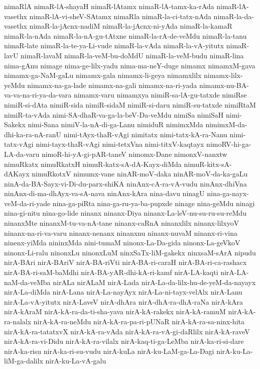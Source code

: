 {nimaRlA
nimaR-lA-shayaH
nimaR-lAtamx
nimaR-lA-tamx-ka-rAda
nimaR-lA-vasethx
nimaR-lA-vi-sheV-SAtamx
nimaRla
nimaR-la-ci-tatx-nAda
nimaR-la-da-vasethx
nimaR-la-jAcnx-nadiM
nimaR-la-jAcnx-ni-yAda
nimaR-la-kamaR
nimaR-la-nAda
nimaR-la-nA-gu-tAtxne
nimaR-la-rA-de-veMdu
nimaR-la-tanu
nimaR-late
nimaR-la-te-ya-Li-vude
nimaR-la-vAda
nimaR-la-vA-yitutx
nimaR-lavU
nimaR-lavaM
nimaR-la-veM-bu-doMdU
nimaR-la-veM-budu
nimaR-lina
nima-gAnu
nimage
nima-ge-lilx-yadu
nima-ma-neY-duge
nimamx
nimamxM-gava
nimamx-ga-NaM-gaLu
nimamx-gala
nimamx-li-geya
nimamxlilx
nimamx-lilx-yeMdu
nimamx-na-ga-lade
nimamx-na-gali
nimamx-na-ri-yada
nimamx-nu-BA-va-va-na-ri-ya-da-vara
nimamx-varu
nimamxya
nimiR-sa-lA-gu-tatxde
nimiRse
nimiR-si-dAta
nimiR-sida
nimiR-sidaM
nimiR-si-daru
nimiR-su-tatxde
nimiRtaM
nimiR-ta-vAda
nimi-SA-dhaR-va-ga-la-beV-Da-veMdu
nimiSa
nimiSaH
nimi-Sakekx
nimi-Sana
nimiV-la-nA-di-ga-Lanu
nimiduR
nimimxMda
nimimxM-da-dhi-ka-ra-nA-ranU
nimi-tAyx-thaR-vAgi
nimitatx
nimi-tatx-kA-ra-Nanu
nimi-tatx-vAgi
nimi-tayx-thaR-vAgi
nimi-tetxVna
nimi-titxV-kaqtayx
nimoRV-hi-ga-LA-da-varu
nimoR-hi-yA-gi-pAR-taneV
nimomx-Dane
nimonxV-nanxtw
nimuRkatx
nimuRkatxH
nimuR-katx-sA-dA-Kayx-diMda
nimuR-kitx-sA-dAKayx
nimuRkotxV
nimumx-vane
ninAR-moV-daka
ninAR-moV-da-ka-gaLu
ninA-da-BA-Sayx-vi-Di-du-parx-shiKA
ninAnx-cA-ra-vA-vudu
ninAnx-dhiVna
ninAnx-di-ma-dhAyx-va-sA-nava
ninAnx-kAra
nina-davu
ninagU
nina-ga-nayx-veM-da-ri-yade
nina-ga-piRta
nina-ga-ru-ya-ba-pupxde
ninage
nina-geMdu
ninagi
nina-gi-nitu
nina-go-lide
ninanx
ninanx-Diya
ninanx-La-leV-nu-su-ru-su-reMdu
ninanxMte
ninanxM-tu-va-nA-tane
ninanx-caRnA
ninanxlilx
ninanx-lilxyoV
ninanx-na-ri-va-varu
ninanx-nenanx
ninanxnu
ninanx-nuvaM
ninanx-ri-vina
ninenx-yiMda
nininxMda
nini-tumaM
ninonx-La-Da-gida
ninonx-La-geVkoV
ninonx-Li-ralu
ninonxLu
ninonxLuM
ninxSaTx-liM-gakekx
ninxsaM-sArA
nipudu
nirA-BAri
nirA-BAriV
nirA-BA-riVti
nirA-BA-ri-caraH
nirA-BA-ri-ca-rashacx
nirA-BA-ri-saM-baMdhi
nirA-BA-yAR-dhi-kA-ri-kamf
nirA-LA-kaqti
nirA-LA-naM-da-veMba
nirALa
nirALaM
nirA-Lada
nirA-La-da-lilx-hu-de-yeM-da-nayayx
nirA-La-diMda
nirA-Lana
nirA-La-nayAyx
nirA-La-ni-tayx-velAlx
nirA-Lanu
nirA-La-vA-yitutx
nirA-LaveV
nirA-dhAra
nirA-dhA-ra-dhA-raNa
nirA-kAra
nirA-kAraM
nirA-kA-ra-da-ti-sha-yava
nirA-kA-rakekx
nirA-kA-ramuM
nirA-kA-ra-nalalx
nirA-kA-ra-neMdu
nirA-kA-ra-pa-ri-pUNaR
nirA-kA-ra-sa-ninx-hita
nirA-kA-ra-tatatxvX
nirA-kA-ra-vAda
nirA-kA-ra-vA-gi-daRlilx
nirA-kA-raveV
nirA-kA-ra-vi-Didu
nirA-kA-ra-vilalx
nirA-kaq-ti-ga-LeMba
nirA-ka-ri-si-dare
nirA-ka-risu
nirA-ka-ri-su-vudu
nirA-kuLa
nirA-ku-LaM-ga-La-Dagi
nirA-ku-La-liM-ga-dalilx
nirA-ku-La-vA-galu
}
